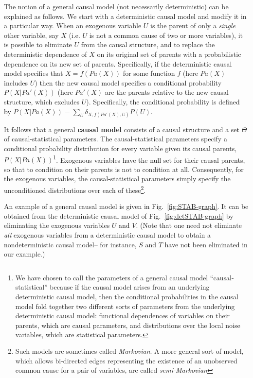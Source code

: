 \documentclass[letterpaper,onecolumn,nofootinbib]{revtex4}
\begin{document}
The notion of a general causal model (not necessarily deterministic) can be explained as follows. We start with a deterministic causal model and modify it in a particular way.  When an exogenous variable $U$ is the parent of only a \emph{single} other variable, say $X$ (i.e. $U$ is not a common cause of two or more variables), it is possible to eliminate $U$ from the causal structure, and to replace the deterministic dependence of $X$ on its original set of parents with a probabilistic dependence on its new set of parents.  Specifically, if the deterministic causal model specifies that $X = f(Pa(X))$ for some function $f$ (here $Pa(X)$ includes $U$) then the new causal model specifies a conditional probability $P(X|Pa'(X))$ (here $Pa'(X)$ are the parents relative to the new causal structure, which excludes $U$). Specifically, the conditional probability is defined by $P(X|Pa(X))=\sum_U \delta_{X,f(Pa'(X),U)}P(U)$.

It follows that a general \textbf{causal model} consists of a causal structure and a set $\Theta$ of
causal-statistical parameters.  The causal-statistical parameters specify a conditional probability distribution for every variable given its causal parents, $P(X|Pa(X))$\footnote{ We have chosen to call the parameters of a general causal model ``causal-statistical'' because if the causal model arises from an underlying deterministic causal model,
then the conditional probabilities in the causal model fold together two different sorts of parameters from the underlying deterministic causal model: functional dependences of variables on their parents, which are causal parameters, and distributions over the local noise variables, which are statistical parameters. \color{black} 
\color{black}}.   Exogenous variables have the null set for their causal parents, so that to condition on their parents is not to condition at all.  Consequently, for the exogenous variables, the causal-statistical parameters simply specify the unconditioned distributions over each of these\footnote{Such models are sometimes called \emph{Markovian}. A more general sort of model, which allows bi-directed edges representing the existence of an unobserved common cause for a pair of variables, are called \emph{semi-Markovian}}.

An example of a general causal model is given in Fig.~\ref{fig:STAB-graph}.  It can be obtained from the deterministic causal model of Fig.~\ref{fig:detSTAB-graph} by eliminating the exogenous variables $U$ and $V$. (Note that one need not eliminate \emph{all} exogenous variables from a deterministic causal model to obtain a nondeterministic causal model-- for instance, $S$ and $T$ have not been eliminated in our example.)
\end{document}
